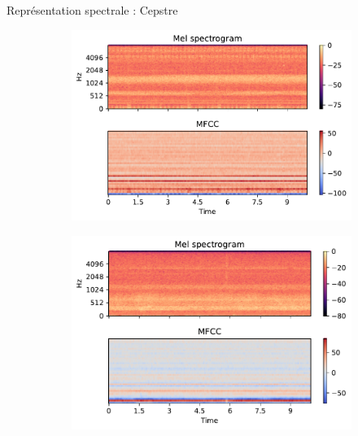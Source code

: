 \documentclass[compress,xcolor=table]{beamer}
\begin{document}
\begin{frame}{Représentation spectrale : Cepstre}

    \begin{figure}[ht]
        \centering
        \begin{subfigure}[b]{0.45\textwidth}
            \centering
            \includegraphics[width=\textwidth]{../images/audio/birds.mfcc.birdvox.pdf}
            \label{fig:birds.mfcc.birdvox}
        \end{subfigure}
        \hfill
        \begin{subfigure}[b]{0.45\textwidth}
            \centering
            \includegraphics[width=\textwidth]{../images/audio/nobirds.mfcc.birdvox.pdf}
            \label{fig:nobirds.mfcc.birdvox}
        \end{subfigure}

        \vspace{-0.7cm}
        

\end{figure}
\end{frame}
\end{document}
